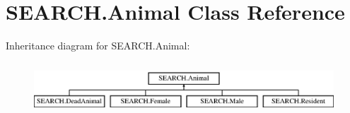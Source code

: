 \hypertarget{class_s_e_a_r_c_h_1_1_animal}{\section{S\-E\-A\-R\-C\-H.\-Animal Class Reference}
\label{class_s_e_a_r_c_h_1_1_animal}
}
Inheritance diagram for S\-E\-A\-R\-C\-H.\-Animal\-:\begin{figure}[H]
\begin{center}
\leavevmode
\includegraphics[height=1.958042cm]{class_s_e_a_r_c_h_1_1_animal}
\end{center}
\end{figure}
